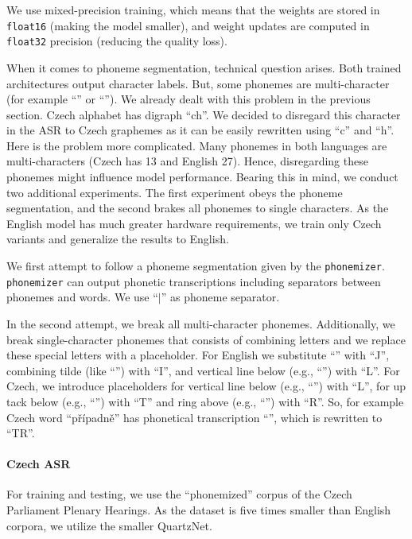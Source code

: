 We use mixed-precision training, which means that the weights are stored in \texttt{float16} (making the model smaller), and weight updates are computed in \texttt{float32} precision (reducing the quality loss).

When it comes to phoneme segmentation, technical question arises. Both trained architectures output character labels. But, some phonemes are multi-character (for example ``'' or ``''). We already dealt with this problem in the previous section. Czech alphabet has digraph ``ch''. We decided to disregard this character in the ASR to Czech graphemes as it can be easily rewritten using ``c'' and ``h''. Here is the problem more complicated. Many phonemes in both languages are multi-characters (Czech has 13 and English 27). Hence, disregarding these phonemes might influence model performance. Bearing this in mind, we conduct two additional experiments. The first experiment obeys the phoneme segmentation, and the second brakes all phonemes to single characters. As the English model has much greater hardware requirements, we train only Czech variants and generalize the results to English.

We first attempt to follow a phoneme segmentation given by the \texttt{phonemizer}. \texttt{phonemizer} can output phonetic transcriptions including separators between pho\-ne\-mes and words. We use ``$\mid$'' as phoneme separator.

In the second attempt, we break all multi-character phonemes. Additionally, we break single-character phonemes that consists of combining letters and we replace these special letters with a placeholder. For English we substitute ``'' with ``J'', combining tilde (like ``'') with ``I'', and vertical line below (e.g., ``'') with ``L''. For Czech, we introduce placeholders for vertical line below (e.g., ``'') with ``L'', for up tack below (e.g., ``'') with ``T'' and ring above (e.g., ``'') with ``R''. So, for example Czech word ``p\v{r}\'ipadn\v{e}'' has phonetical transcription ``'', which is rewritten to ``TR''.

\paragraph{Czech ASR}
For training and testing, we use the ``phonemized'' corpus of the Czech Parliament Plenary Hearings. As the dataset is five times smaller than English corpora, we utilize the smaller QuartzNet.

